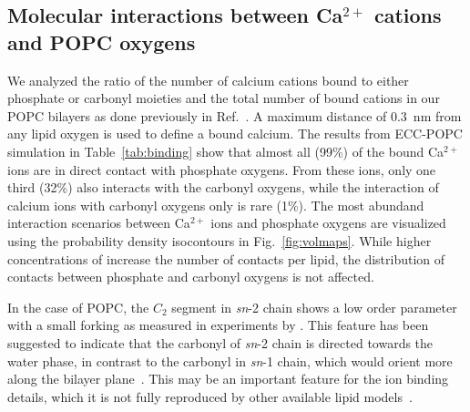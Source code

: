 









 


 
\subsection{Molecular interactions between Ca$^{2+}$ cations and POPC oxygens} 
We analyzed the ratio of the number of calcium cations bound to either phosphate or carbonyl moieties and the total number of bound cations in our POPC bilayers as done previously in Ref.~\citep{javanainen17}. A maximum distance of 0.3~nm from any lipid oxygen is used to define a bound calcium. The results from ECC-POPC simulation in Table~\ref{tab:binding} show that almost all (99\%) of the bound Ca$^{2+}$ ions are in direct contact with phosphate oxygens. From these ions, only one third (32\%) also interacts with the carbonyl oxygens, while the interaction of calcium ions with carbonyl oxygens only is rare (1\%). The most abundand interaction scenarios between Ca$^{2+}$ ions and phosphate oxygens are visualized using the probability density isocontours in Fig.~\ref{fig:volmaps}. While higher concentrations of  increase the number of contacts per lipid, the distribution of contacts between phosphate and carbonyl oxygens is not affected. 
 
In the case of POPC, the $C_2$ segment in {\it sn}-2 chain shows a low order parameter with a small forking as measured in experiments by \citet{seelig75,schindler75,gawrisch92}. 
This feature has been suggested to indicate that the carbonyl
of {\it sn}-2 chain is directed towards the water phase, in contrast to the
carbonyl in {\it sn}-1 chain, which would orient more along the bilayer
plane~\cite{seelig75,schindler75,gawrisch92}. This may be an important
feature for the ion binding details, which it is not fully reproduced by other
available lipid models~\cite{ollila16}.


